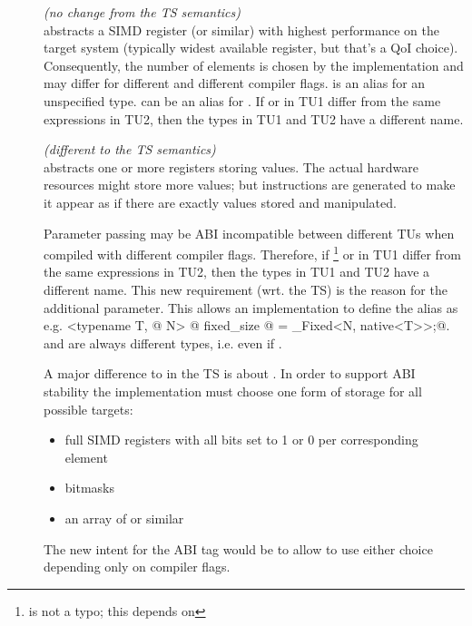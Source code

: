 \begin{description}
  \item[] \emph{(no change from the TS semantics)}\\
     abstracts a SIMD register (or similar) with highest performance on the target system (typically widest available register, but that's a QoI choice).
    Consequently, the number of elements is chosen by the implementation and may differ for different  and different compiler flags.
    \simdabi{} is an alias for an unspecified type.
    \simdabi{} can be an alias for \simdabi{}.
    If  or  in TU1 differ from the same expressions in TU2, then the types  in TU1 and TU2 have a different name.

  \item[] \emph{(different to the TS semantics)}\\
     abstracts one or more registers storing  values.
    The actual hardware resources might store more values; but instructions are generated to make it appear as if there are exactly  values stored and manipulated.

    Parameter passing may be ABI incompatible between different TUs when compiled with different compiler flags.
    Therefore, if %
    \footnote{ is not a typo; this depends on \simdabi{}}
    or  in TU1
    differ from the same expressions in TU2, then the types  in TU1
    and TU2 have a different name.
    This new requirement (wrt. the TS) is the reason for the additional
     parameter.
    This allows an implementation to define the  alias as e.g.
    \lstinline@template <typename T, @
    \lstinline@int N> @
    \lstinline@using fixed_size @
    \lstinline@= _Fixed<N, native<T>>;@.
     and  are always different types, i.e. even if .

    A major difference to \stdx\simdabi{} in the TS is about .
    In order to support ABI stability the  implementation must choose one form of storage for all possible targets:
    \begin{itemize}
      \item full SIMD registers with all bits set to 1 or 0 per corresponding element
      \item bitmasks
      \item an array of  or similar
    \end{itemize}
    The new intent for the  ABI tag would be to allow  to use either choice depending only on compiler flags.


\end{description}
